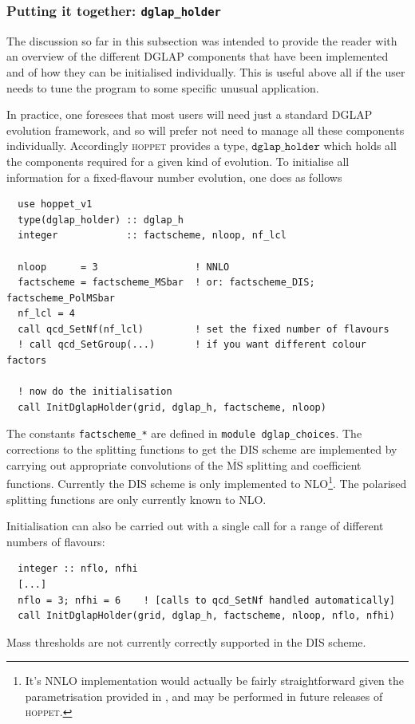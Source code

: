 \documentclass[12pt]{article}
\newcommand{\MSbar}{\overline{\mathrm{MS}}}
\newcommand{\hoppet}{\textsc{hoppet}\xspace}
\newcommand{\ttt}[1]{\texttt{#1}}
\begin{document}
\subsubsection{Putting it together: \ttt{dglap\_holder}}

The discussion so far in this subsection was intended to provide the
reader with an overview of the different DGLAP components that have
been implemented and of how they can be initialised individually. This
is useful above all if the user needs to tune the program to some
specific unusual application.

In practice, one foresees that most users will need just a standard
DGLAP evolution framework, and so will prefer not need to manage
all these components individually. Accordingly \hoppet provides a
type, $\ttt{dglap\_holder}$ which holds all the components 
required for
a given kind of evolution. To initialise all information for a
fixed-flavour number evolution, one does as follows
%
\begin{lstlisting}
  use hoppet_v1
  type(dglap_holder) :: dglap_h
  integer            :: factscheme, nloop, nf_lcl  

  nloop      = 3                 ! NNLO
  factscheme = factscheme_MSbar  ! or: factscheme_DIS; factscheme_PolMSbar
  nf_lcl = 4
  call qcd_SetNf(nf_lcl)         ! set the fixed number of flavours
  ! call qcd_SetGroup(...)       ! if you want different colour factors

  ! now do the initialisation
  call InitDglapHolder(grid, dglap_h, factscheme, nloop)
\end{lstlisting}
The constants \ttt{factscheme\_*} are defined in \ttt{module
  dglap\_choices}. %
The corrections to the splitting functions to get the DIS scheme are
implemented by carrying out appropriate convolutions of the $\MSbar$
splitting and coefficient functions. Currently the DIS scheme is only
implemented to NLO\footnote{It's NNLO implementation would actually be fairly
straightforward given the parametrisation provided in
\cite{White:2005wm}, and may be performed in
future releases of \hoppet.}.
 The polarised splitting functions are only currently known to NLO.

Initialisation can also be carried out with a single call for a range of
different numbers of flavours:
\begin{lstlisting}
  integer :: nflo, nfhi
  [...]
  nflo = 3; nfhi = 6    ! [calls to qcd_SetNf handled automatically]
  call InitDglapHolder(grid, dglap_h, factscheme, nloop, nflo, nfhi)
\end{lstlisting}
Mass thresholds are not currently correctly supported in the DIS
scheme.
\end{document}
